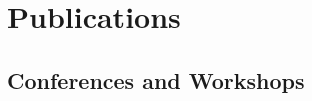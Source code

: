 \documentclass[letterpaper,10pt]{article}
\renewenvironment{itemize}{
	\begin{list}{}{
			\setlength{\leftmargin}{1.5em}
		}
	}{
	\end{list}
}
\begin{document}
	\section*{Publications}



	\subsection*{Conferences and Workshops} %
\end{document}
